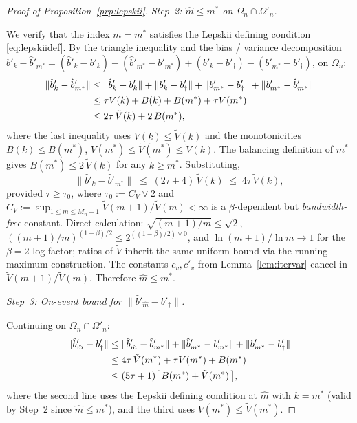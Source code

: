 \begin{proof}[Proof of Proposition~\ref{prp:lepskii}]
\smallskip
\emph{Step~2: $\hat m \le m^*$ on $\Omega_n \cap \Omega'_n$.}

We verify that the index $m = m^*$ satisfies the Lepskii defining condition
\eqref{eq:lepskiidef}. By the triangle inequality and the bias / variance
decomposition $\hat b'_k - \hat b'_{m^*} = (\hat b'_k - b'_k) - (\hat
b'_{m^*} - b'_{m^*}) + (b'_k - b'_\dagger) - (b'_{m^*} - b'_\dagger)$, on
$\Omega_n$:
\begin{align}
\|\hat b'_k - \hat b'_{m^*}\|
&\le \|\hat b'_k - b'_k\| + \|b'_k - b'_\dagger\|
   + \|b'_{m^*} - b'_\dagger\| + \|b'_{m^*} - \hat b'_{m^*}\| \notag\\
&\le \tau V(k) + B(k) + B(m^*) + \tau V(m^*)
   \notag\\
&\le 2\tau\,\tilde V(k) + 2\,B(m^*),
   \label{eq:cert1-pf}
\end{align}
where the last inequality uses $V(k) \le \tilde V(k)$ and the monotonicities
$B(k) \le B(m^*)$, $V(m^*) \le \tilde V(m^*) \le \tilde V(k)$. The balancing
definition of $m^*$ gives $B(m^*) \le 2\,\tilde V(k)$ for any $k \ge m^*$.
Substituting,
\[
\|\hat b'_k - \hat b'_{m^*}\| \;\le\; (2\tau + 4)\,\tilde V(k)
\;\le\; 4\tau\,\tilde V(k),
\]
provided $\tau \ge \tau_0$, where
$\tau_0 := C_V \vee 2$ and
$C_V := \sup_{1 \le m \le M_n - 1}\tilde V(m+1)/\tilde V(m) < \infty$ is
a $\beta$-dependent but \emph{bandwidth-free} constant. Direct
calculation: $\sqrt{(m+1)/m} \le \sqrt 2$,
$((m+1)/m)^{(1-\beta)/2} \le 2^{((1-\beta)/2)\vee 0}$, and
$\ln(m+1)/\ln m \to 1$ for the $\beta = 2$ log factor; ratios of
$\tilde V$ inherit the same uniform bound via the running-maximum
construction. The constants $c_v, c'_v$ from
Lemma~\ref{lem:itervar} cancel in $\tilde V(m+1)/\tilde V(m)$.
Therefore $\hat m \le m^*$.

\smallskip
\emph{Step~3: On-event bound for $\|\hat b'_{\hat m} - b'_\dagger\|$.}

Continuing on $\Omega_n \cap \Omega'_n$:
\begin{align}
\|\hat b'_{\hat m} - b'_\dagger\|
&\le \|\hat b'_{\hat m} - \hat b'_{m^*}\|
  + \|\hat b'_{m^*} - b'_{m^*}\|
  + \|b'_{m^*} - b'_\dagger\| \notag\\
&\le 4\tau\,\tilde V(m^*) + \tau V(m^*) + B(m^*)
   \notag\\
&\le (5\tau + 1)\bigl[\,B(m^*) + \tilde V(m^*)\,\bigr],
   \label{eq:on-event-pf}
\end{align}
where the second line uses the Lepskii defining condition at $\hat m$ with
$k = m^*$ (valid by Step~2 since $\hat m \le m^*$), and the third uses
$V(m^*) \le \tilde V(m^*)$.


\end{proof}
